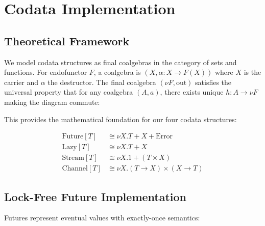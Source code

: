 \documentclass[sigconf,anonymous]{acmart}
\begin{document}
\section{Codata Implementation}

\subsection{Theoretical Framework}

We model codata structures as final coalgebras in the category of sets and functions. For endofunctor $F$, a coalgebra is $(X, \alpha: X \to F(X))$ where $X$ is the carrier and $\alpha$ the destructor. The final coalgebra $(\nu F, \text{out})$ satisfies the universal property that for any coalgebra $(A, a)$, there exists unique $h: A \to \nu F$ making the diagram commute:

\begin{center}
\end{center}

This provides the mathematical foundation for our four codata structures:

\begin{align}
\text{Future}[T] &\cong \nu X. T + X + \text{Error} \\
\text{Lazy}[T] &\cong \nu X. T + X \\
\text{Stream}[T] &\cong \nu X. 1 + (T \times X) \\
\text{Channel}[T] &\cong \nu X. (T \to X) \times (X \to T)
\end{align}

\subsection{Lock-Free Future Implementation}

Futures represent eventual values with exactly-once semantics:
\end{document}
